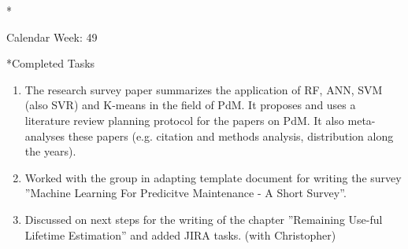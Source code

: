 \documentclass[11pt,a4paper]{article}
\begin{document}
\newpage
\begin{section}*{Calendar Week: 49 \hfill \date{4 December, 2020}}
 \begin{refsection}
     \begin{subsection}*{Completed Tasks}
         \begin{enumerate}
             \item
                   The research survey paper \cite{DBLP:journals/candie/CarvalhoSVFBA19} summarizes the application of RF, ANN, SVM (also SVR) and K-means in the field of PdM. It proposes and uses a literature review planning protocol for the papers on PdM. It also meta-analyses these papers (e.g. citation and methods analysis, distribution along the years).
             \item
                   Worked with the group in adapting template document for writing the survey ”Machine Learning For Predicitve Maintenance - A Short Survey”.
             \item
                   Discussed on next steps for the writing of the chapter ”Remaining Use-ful Lifetime Estimation” and added JIRA tasks. (with Christopher)
         \end{enumerate}
     \end{subsection}
     \printbibliography
 \end{refsection}
\end{section}
\end{document}
